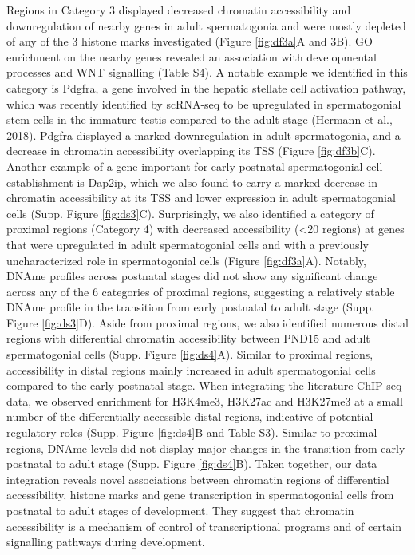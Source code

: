 \documentclass[12pt,twoside]{reedthesis}
\begin{document}
Regions in Category 3 displayed decreased chromatin accessibility and
downregulation of nearby genes in adult spermatogonia and were mostly
depleted of any of the 3 histone marks investigated (Figure \ref{fig:df3a}A and 3B). GO
enrichment on the nearby genes revealed an association with
developmental processes and WNT signalling (Table S4). A notable example
we identified in this category is Pdgfra, a gene involved in the hepatic
stellate cell activation pathway, which was recently identified by
scRNA-seq to be upregulated in spermatogonial stem cells in the immature
testis compared to the adult stage (\protect\hyperlink{ref-hermann2018}{Hermann et al., 2018}). Pdgfra displayed a
marked downregulation in adult spermatogonia, and a decrease in
chromatin accessibility overlapping its TSS (Figure \ref{fig:df3b}C). Another example
of a gene important for early postnatal spermatogonial cell
establishment is Dap2ip, which we also found to carry a marked decrease
in chromatin accessibility at its TSS and lower expression in adult
spermatogonial cells (Supp. Figure \ref{fig:ds3}C). Surprisingly, we also identified a
category of proximal regions (Category 4) with decreased accessibility
(\textless20 regions) at genes that were upregulated in adult spermatogonial
cells and with a previously uncharacterized role in spermatogonial cells
(Figure \ref{fig:df3a}A). Notably, DNAme profiles across postnatal stages did not show
any significant change across any of the 6 categories of proximal
regions, suggesting a relatively stable DNAme profile in the transition
from early postnatal to adult stage (Supp. Figure \ref{fig:ds3}D). Aside from proximal
regions, we also identified numerous distal regions with differential
chromatin accessibility between PND15 and adult spermatogonial cells
(Supp. Figure \ref{fig:ds4}A). Similar to proximal regions, accessibility in distal regions
mainly increased in adult spermatogonial cells compared to the early
postnatal stage. When integrating the literature ChIP-seq data, we
observed enrichment for H3K4me3, H3K27ac and H3K27me3 at a small number
of the differentially accessible distal regions, indicative of potential
regulatory roles (Supp. Figure \ref{fig:ds4}B and Table S3). Similar to proximal regions,
DNAme levels did not display major changes in the transition from early
postnatal to adult stage (Supp. Figure \ref{fig:ds4}B). Taken together, our data
integration reveals novel associations between chromatin regions of
differential accessibility, histone marks and gene transcription in
spermatogonial cells from postnatal to adult stages of development. They
suggest that chromatin accessibility is a mechanism of control of
transcriptional programs and of certain signalling pathways during
development.
\end{document}
